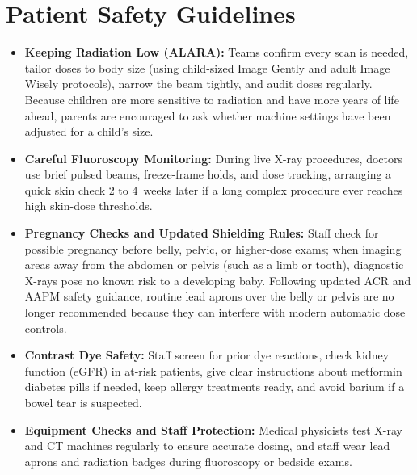 \section{Patient Safety Guidelines}
\begin{itemize}
  \item \textbf{Keeping Radiation Low (ALARA):} Teams confirm every scan is needed, tailor doses to body size (using child-sized Image Gently and adult Image Wisely protocols), narrow the beam tightly, and audit doses regularly. Because children are more sensitive to radiation and have more years of life ahead, parents are encouraged to ask whether machine settings have been adjusted for a child's size.
  \item \textbf{Careful Fluoroscopy Monitoring:} During live X-ray procedures, doctors use brief pulsed beams, freeze-frame holds, and dose tracking, arranging a quick skin check 2 to 4~weeks later if a long complex procedure ever reaches high skin-dose thresholds.
  \item \textbf{Pregnancy Checks and Updated Shielding Rules:} Staff check for possible pregnancy before belly, pelvic, or higher-dose exams; when imaging areas away from the abdomen or pelvis (such as a limb or tooth), diagnostic X-rays pose no known risk to a developing baby. Following updated ACR and AAPM safety guidance, routine lead aprons over the belly or pelvis are no longer recommended because they can interfere with modern automatic dose controls.
  \item \textbf{Contrast Dye Safety:} Staff screen for prior dye reactions, check kidney function (eGFR) in at-risk patients, give clear instructions about metformin diabetes pills if needed, keep allergy treatments ready, and avoid barium if a bowel tear is suspected.
  \item \textbf{Equipment Checks and Staff Protection:} Medical physicists test X-ray and CT machines regularly to ensure accurate dosing, and staff wear lead aprons and radiation badges during fluoroscopy or bedside exams.
\end{itemize}

